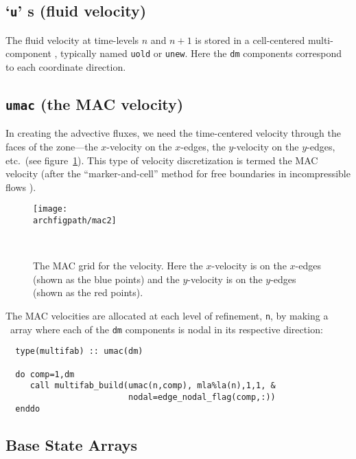 \subsection{`{\tt u}' \multifab s (fluid velocity)}

The fluid velocity at time-levels $n$ and $n+1$ is stored in
a cell-centered multi-component \multifab, typically named
{\tt uold} or {\tt unew}.  Here the {\tt dm}
components correspond to each coordinate direction.

\subsection{{\tt umac} (the MAC velocity)}

In creating the advective fluxes, we need the time-centered velocity
through the faces of the zone---the $x$-velocity on the $x$-edges, the
$y$-velocity on the $y$-edges, etc.\ (see figure~\ref{fig:mac}).  This
type of velocity discretization is termed the MAC velocity (after the
``marker-and-cell'' method for free boundaries in incompressible
flows \cite{harlowwelch:1965}).



\begin{figure}[h]
\centering
\texttt{[image: \\archfigpath/mac2]}
\hspace{0.1in}
\begin{minipage}[b]{3.8in}
\caption[The MAC grid]
{\label{fig:mac} The MAC grid for the velocity.  
Here the $x$-velocity is on the $x$-edges (shown as the 
blue points) and the $y$-velocity is on the $y$-edges
(shown as the red points).
}\ \\
\end{minipage}
\end{figure}

The MAC velocities are allocated at each level of refinement, {\tt n},
by making a \multifab\ array where each of the {\tt dm} components is
nodal in its respective direction:
\begin{verbatim}
  type(multifab) :: umac(dm)

  do comp=1,dm
     call multifab_build(umac(n,comp), mla%la(n),1,1, &
                         nodal=edge_nodal_flag(comp,:))
  enddo
\end{verbatim}



\subsection{Base State Arrays}


